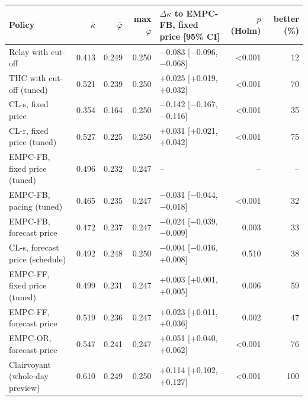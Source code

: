 \begin{tabular}{lrrrlrr}
\toprule
Policy & $\bar\kappa$ & $\bar\varphi$ & max $\varphi$ & $\Delta\kappa$ to EMPC-FB, fixed price [95\% CI] & $p$ (Holm) & better (\%)\\
\midrule
Relay with cut-off & 0.413 & 0.249 & 0.250 & \ensuremath{-}0.083 [\ensuremath{-}0.096, \ensuremath{-}0.068] & <0.001 & 12\\
THC with cut-off (tuned) & 0.521 & 0.239 & 0.250 & +0.025 [+0.019, +0.032] & <0.001 & 70\\
\midrule
CL-s, fixed price & 0.354 & 0.164 & 0.250 & \ensuremath{-}0.142 [\ensuremath{-}0.167, \ensuremath{-}0.116] & <0.001 & 35\\
CL-r, fixed price (tuned) & 0.527 & 0.225 & 0.250 & +0.031 [+0.021, +0.042] & <0.001 & 75\\
EMPC-FB, fixed price (tuned) & 0.496 & 0.232 & 0.247 & -- & -- & --\\
EMPC-FB, pacing (tuned) & 0.465 & 0.235 & 0.247 & \ensuremath{-}0.031 [\ensuremath{-}0.044, \ensuremath{-}0.018] & <0.001 & 32\\
EMPC-FB, forecast price & 0.472 & 0.237 & 0.247 & \ensuremath{-}0.024 [\ensuremath{-}0.039, \ensuremath{-}0.009] & 0.003 & 33\\
\midrule
CL-s, forecast price (schedule) & 0.492 & 0.248 & 0.250 & \ensuremath{-}0.004 [\ensuremath{-}0.016, +0.008] & 0.510 & 38\\
EMPC-FF, fixed price (tuned) & 0.499 & 0.231 & 0.247 & +0.003 [+0.001, +0.005] & 0.006 & 59\\
EMPC-FF, forecast price & 0.519 & 0.236 & 0.247 & +0.023 [+0.011, +0.036] & 0.002 & 47\\
\midrule
EMPC-OR, forecast price & 0.547 & 0.241 & 0.247 & +0.051 [+0.040, +0.062] & <0.001 & 76\\
Clairvoyant (whole-day preview) & 0.610 & 0.249 & 0.250 & +0.114 [+0.102, +0.127] & <0.001 & 100\\
\bottomrule
\end{tabular}

